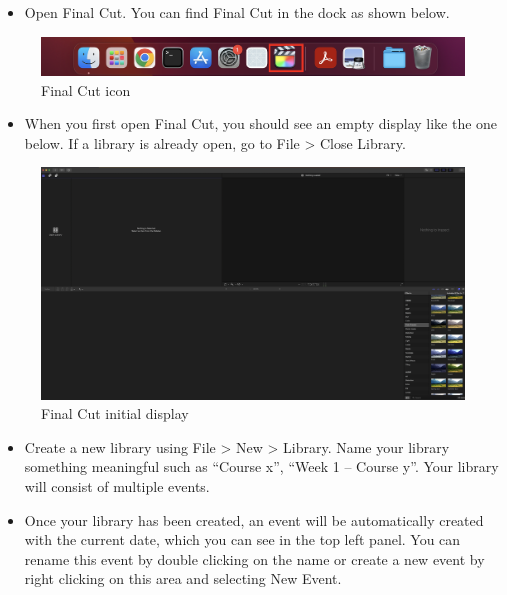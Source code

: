 \documentclass[
]{book}
\providecommand{\tightlist}{%
  \setlength{\itemsep}{0pt}\setlength{\parskip}{0pt}}
\begin{document}
\begin{itemize}
\tightlist
\item
  Open Final Cut. You can find Final Cut in the dock as shown below.
\end{itemize}

\begin{figure}

{\centering \includegraphics[width=1\linewidth]{FinalCutTab} 

}

\caption{Final Cut icon}\label{fig:fcdock}
\end{figure}

\begin{itemize}
\tightlist
\item
  When you first open Final Cut, you should see an empty display like the one below. If a library is already open, go to File \textgreater{} Close Library.
\end{itemize}

\begin{figure}

{\centering \includegraphics[width=1\linewidth]{FinalCutDisplay} 

}

\caption{Final Cut initial display}\label{fig:fcmenu}
\end{figure}

\begin{itemize}
\item
  Create a new library using File \textgreater{} New \textgreater{} Library. Name your library something meaningful such as ``Course x'', ``Week 1 -- Course y''. Your library will consist of multiple events.
\item
  Once your library has been created, an event will be automatically created with the current date, which you can see in the top left panel. You can rename this event by double clicking on the name or create a new event by right clicking on this area and selecting New Event.
\end{itemize}
\end{document}
